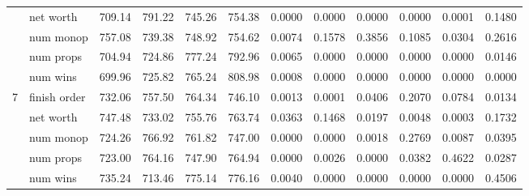 \begin{landscape}
\begin{table}[ht]
\begin{tabularx}{\linewidth}{|p{1in}|p{1in}|r|r|r|r|r|r|r|r|r|r|}
\cline{2-12}       & net worth & 709.14 & \cellcolor{green!55!white}791.22 & 745.26 & \cellcolor{green!55!white}754.38 & 0.0000 & 0.0000 & 0.0000 & 0.0000 & 0.0001 & \cellcolor{red!55!white}0.1480 \\
\cline{2-12}       & num monop & \cellcolor{green!55!white}757.08 & 739.38 & 748.92 & \cellcolor{green!55!white}754.62 & 0.0074 & \cellcolor{red!55!white}0.1578 & \cellcolor{red!55!white}0.3856 & \cellcolor{red!55!white}0.1085 & \cellcolor{red!55!white}0.0304 & \cellcolor{red!55!white}0.2616 \\
\cline{2-12}       & num props & 704.94 & 724.86 & \cellcolor{green!55!white}777.24 & \cellcolor{green!55!white}792.96 & 0.0065 & 0.0000 & 0.0000 & 0.0000 & 0.0000 & \cellcolor{red!55!white}0.0146 \\
\cline{2-12}       & num wins & 699.96 & 725.82 & \cellcolor{green!55!white}765.24 & \cellcolor{green!55!white}808.98 & 0.0008 & 0.0000 & 0.0000 & 0.0000 & 0.0000 & 0.0000 \\
      \cline{1-12}
      \multirow{5}{*}{7} & finish order & 732.06 & \cellcolor{green!55!white}757.50 & \cellcolor{green!55!white}764.34 & 746.10 & 0.0013 & 0.0001 & \cellcolor{red!55!white}0.0406 & \cellcolor{red!55!white}0.2070 & \cellcolor{red!55!white}0.0784 & \cellcolor{red!55!white}0.0134 \\
\cline{2-12}       & net worth & 747.48 & 733.02 & \cellcolor{green!55!white}755.76 & \cellcolor{green!55!white}763.74 & \cellcolor{red!55!white}0.0363 & \cellcolor{red!55!white}0.1468 & \cellcolor{red!55!white}0.0197 & 0.0048 & 0.0003 & \cellcolor{red!55!white}0.1732 \\
\cline{2-12}       & num monop & 724.26 & \cellcolor{green!55!white}766.92 & \cellcolor{green!55!white}761.82 & 747.00 & 0.0000 & 0.0000 & 0.0018 & \cellcolor{red!55!white}0.2769 & 0.0087 & \cellcolor{red!55!white}0.0395 \\
\cline{2-12}       & num props & 723.00 & \cellcolor{green!55!white}764.16 & 747.90 & \cellcolor{green!55!white}764.94 & 0.0000 & 0.0026 & 0.0000 & \cellcolor{red!55!white}0.0382 & \cellcolor{red!55!white}0.4622 & \cellcolor{red!55!white}0.0287 \\
\cline{2-12}       & num wins & 735.24 & 713.46 & \cellcolor{green!55!white}775.14 & \cellcolor{green!55!white}776.16 & 0.0040 & 0.0000 & 0.0000 & 0.0000 & 0.0000 & \cellcolor{red!55!white}0.4506 \\
      \cline{1-12}

    \end{tabularx}%
  \label{tab:intrapop128_numwins}%
\end{table}%


\end{landscape}
